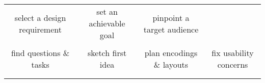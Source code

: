 {\begin{longtable}[]{cccc}
\begin{minipage}[t]{0.21\columnwidth}
select a design requirement\strut
\end{minipage} & \begin{minipage}[t]{0.21\columnwidth}\raggedright\strut
set an achievable goal\strut
\end{minipage} & \begin{minipage}[t]{0.21\columnwidth}\raggedright\strut
pinpoint a target audience\strut
\end{minipage}\tabularnewline
\begin{minipage}[t]{0.24\columnwidth}\raggedright\strut
\strut
\end{minipage} & \begin{minipage}[t]{0.24\columnwidth}\raggedright\strut
\strut
\end{minipage} & \begin{minipage}[t]{0.24\columnwidth}\raggedright\strut
\strut
\end{minipage} & \begin{minipage}[t]{0.24\columnwidth}\raggedright\strut
\strut
\end{minipage}\tabularnewline
\begin{minipage}[t]{0.21\columnwidth}\raggedright\strut
find questions \& tasks\strut
\end{minipage} & \begin{minipage}[t]{0.21\columnwidth}\raggedright\strut
sketch first idea\strut
\end{minipage} & \begin{minipage}[t]{0.21\columnwidth}\raggedright\strut
plan encodings \& layouts\strut
\end{minipage} & \begin{minipage}[t]{0.21\columnwidth}\raggedright\strut
fix usability concerns\strut
\end{minipage}\tabularnewline
\begin{minipage}[t]{0.24\columnwidth}\raggedright\strut
\strut
\end{minipage} & \begin{minipage}[t]{0.24\columnwidth}\raggedright\strut
\strut
\end{minipage} & \begin{minipage}[t]{0.24\columnwidth}\raggedright\strut
\strut
\end{minipage} & \begin{minipage}[t]{0.24\columnwidth}\raggedright\strut
\strut
\end{minipage}\tabularnewline
\begin{minipage}[t]{0.21\columnwidth}\raggedright\strut

\end{minipage}
\end{longtable}}
